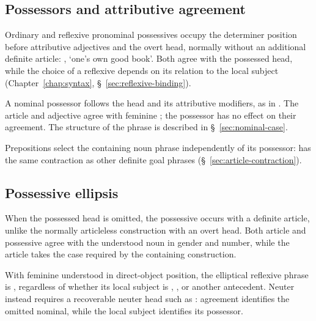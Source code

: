 \subsection{Possessors and attributive agreement}

Ordinary and reflexive pronominal possessives occupy the determiner position before attributive adjectives and the overt head, normally without an additional definite article: ,  `one's own good book'. Both agree with the possessed head, while the choice of a reflexive depends on its relation to the local subject (Chapter~\ref{chap:syntax}, \S~\ref{sec:reflexive-binding}).

A nominal possessor follows the head and its attributive modifiers, as in . The article and adjective agree with feminine ; the possessor has no effect on their agreement. The structure of the  phrase is described in \S~\ref{sec:nominal-case}.

Prepositions select the containing noun phrase independently of its possessor:  has the same contraction as other definite goal phrases (\S~\ref{sec:article-contraction}).

\subsection{Possessive ellipsis}
\label{sec:possessive-ellipsis}

When the possessed head is omitted, the possessive occurs with a definite article, unlike the normally articleless construction with an overt head. Both article and possessive agree with the understood noun in gender and number, while the article takes the case required by the containing construction.

With feminine  understood in direct-object position, the elliptical reflexive phrase is , regardless of whether its local subject is , , or another antecedent. Neuter  instead requires a recoverable neuter head such as : agreement identifies the omitted nominal, while the local subject identifies its possessor.
